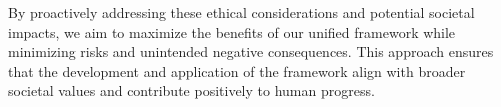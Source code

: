 By proactively addressing these ethical considerations and potential societal impacts, we aim to maximize the benefits of our unified framework while minimizing risks and unintended negative consequences. This approach ensures that the development and application of the framework align with broader societal values and contribute positively to human progress.  